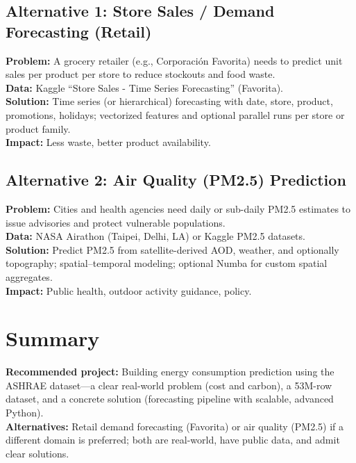 \documentclass[11pt,a4paper]{article}
\begin{document}
\subsection{Alternative 1: Store Sales / Demand Forecasting (Retail)}
\textbf{Problem:} A grocery retailer (e.g., Corporación Favorita) needs to predict unit sales per product per store to reduce stockouts and food waste. \\
\textbf{Data:} Kaggle ``Store Sales - Time Series Forecasting'' (Favorita). \\
\textbf{Solution:} Time series (or hierarchical) forecasting with date, store, product, promotions, holidays; vectorized features and optional parallel runs per store or product family. \\
\textbf{Impact:} Less waste, better product availability.

\subsection{Alternative 2: Air Quality (PM2.5) Prediction}
\textbf{Problem:} Cities and health agencies need daily or sub-daily PM2.5 estimates to issue advisories and protect vulnerable populations. \\
\textbf{Data:} NASA Airathon (Taipei, Delhi, LA) or Kaggle PM2.5 datasets. \\
\textbf{Solution:} Predict PM2.5 from satellite-derived AOD, weather, and optionally topography; spatial--temporal modeling; optional Numba for custom spatial aggregates. \\
\textbf{Impact:} Public health, outdoor activity guidance, policy.

\section{Summary}

\textbf{Recommended project:} Building energy consumption prediction using the ASHRAE dataset---a clear real-world problem (cost and carbon), a 53M-row dataset, and a concrete solution (forecasting pipeline with scalable, advanced Python). \\
\textbf{Alternatives:} Retail demand forecasting (Favorita) or air quality (PM2.5) if a different domain is preferred; both are real-world, have public data, and admit clear solutions.
\end{document}
